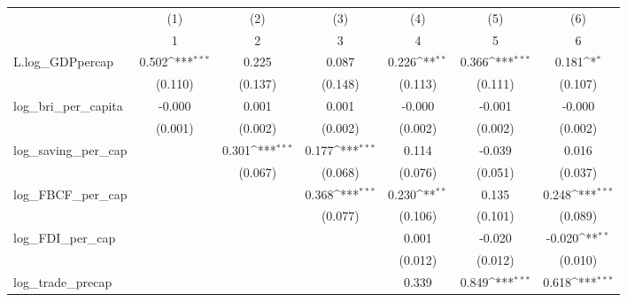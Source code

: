 {
\def\sym#1{\ifmmode^{#1}\else\(^{#1}\)\fi}
\begin{tabular}{l*{6}{c}}
\toprule
            &\multicolumn{1}{c}{(1)}&\multicolumn{1}{c}{(2)}&\multicolumn{1}{c}{(3)}&\multicolumn{1}{c}{(4)}&\multicolumn{1}{c}{(5)}&\multicolumn{1}{c}{(6)}\\
            &\multicolumn{1}{c}{1}&\multicolumn{1}{c}{2}&\multicolumn{1}{c}{3}&\multicolumn{1}{c}{4}&\multicolumn{1}{c}{5}&\multicolumn{1}{c}{6}\\
\midrule
L.log\_GDPpercap&       0.502\sym{***}&       0.225         &       0.087         &       0.226\sym{**} &       0.366\sym{***}&       0.181\sym{*}  \\
            &     (0.110)         &     (0.137)         &     (0.148)         &     (0.113)         &     (0.111)         &     (0.107)         \\
\addlinespace
log\_bri\_per\_capita&      -0.000         &       0.001         &       0.001         &      -0.000         &      -0.001         &      -0.000         \\
            &     (0.001)         &     (0.002)         &     (0.002)         &     (0.002)         &     (0.002)         &     (0.002)         \\
\addlinespace
log\_saving\_per\_cap&                     &       0.301\sym{***}&       0.177\sym{***}&       0.114         &      -0.039         &       0.016         \\
            &                     &     (0.067)         &     (0.068)         &     (0.076)         &     (0.051)         &     (0.037)         \\
\addlinespace
log\_FBCF\_per\_cap&                     &                     &       0.368\sym{***}&       0.230\sym{**} &       0.135         &       0.248\sym{***}\\
            &                     &                     &     (0.077)         &     (0.106)         &     (0.101)         &     (0.089)         \\
\addlinespace
log\_FDI\_per\_cap&                     &                     &                     &       0.001         &      -0.020         &      -0.020\sym{**} \\
            &                     &                     &                     &     (0.012)         &     (0.012)         &     (0.010)         \\
\addlinespace
log\_trade\_precap&                     &                     &                     &       0.339         &       0.849\sym{***}&       0.618\sym{***}\\

\end{tabular}}
